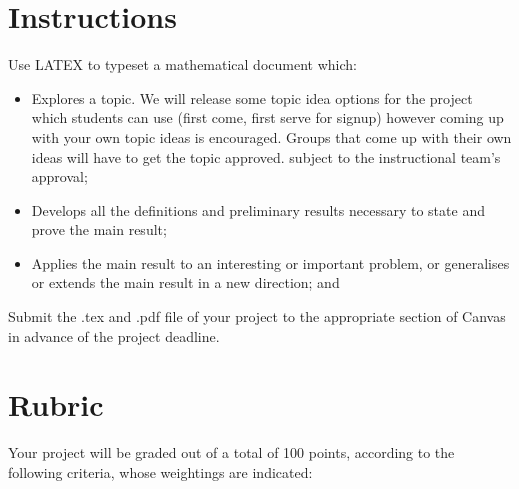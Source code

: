 \documentclass{article}
\begin{document}
\section*{Instructions}
    Use LATEX to typeset a mathematical document which:
    \begin{itemize}
        \item Explores a topic. We will release some topic idea options for the project which students can use (first come, first serve for signup) however coming up with your own topic ideas is encouraged. Groups that come up with their own ideas will have to get the topic approved. subject to the instructional team's approval;
        \item Develops all the definitions and preliminary results necessary to state and prove the main result;
        \item Applies the main result to an interesting or important problem, or generalises or extends the main result in a new direction; and
    \end{itemize}
    Submit the .tex and .pdf file of your project to the appropriate section of Canvas in advance of the project deadline.

\section*{Rubric}
Your project will be graded out of a total of 100 points, according to the following criteria, whose weightings are indicated:
\end{document}
